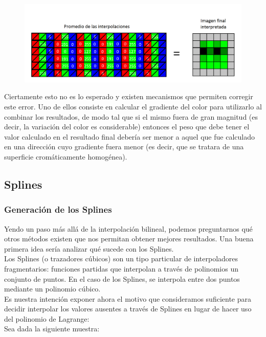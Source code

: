 \documentclass[a4paper]{article}
\begin{document}
\begin{figure}[h!]
	\caption{}
	\begin{center}
	\includegraphics[scale=0.36]{imagenes/apxl3}
	\label{apxl3}
  \end{center}
\end{figure}

\newpage
Ciertamente esto no es lo esperado y existen mecanismos que permiten corregir este error. Uno de ellos consiste en calcular el gradiente del color para utilizarlo al combinar los resultados, de modo tal que si el mismo fuera de gran magnitud (es decir, la variación del color es considerable) entonces el peso que debe tener el valor calculado en el resultado final debería ser menor a aquel que fue calculado en una dirección cuyo gradiente fuera menor (es decir, que se tratara de una superficie cromáticamente homogénea).



\pagebreak

\newpage
\subsection{Splines}
\subsubsection*{Generación de los Splines}
Yendo un paso más allá de la interpolación bilineal, podemos preguntarnos qué otros métodos existen que nos permitan obtener mejores resultados. Una buena primera idea sería analizar qué sucede con los Splines. \\

Los Splines (o trazadores cúbicos) son un tipo particular de interpoladores fragmentarios: funciones partidas que interpolan a través de polinomios un conjunto de puntos. En el caso de los Splines, se interpola entre dos puntos mediante un polinomio cúbico.\\

Es nuestra intención exponer ahora el motivo que consideramos suficiente para decidir interpolar los valores ausentes a través de Splines en lugar de hacer uso del polinomio de Lagrange:\\
Sea dada la siguiente muestra: \\
\smallskip
\end{document}
